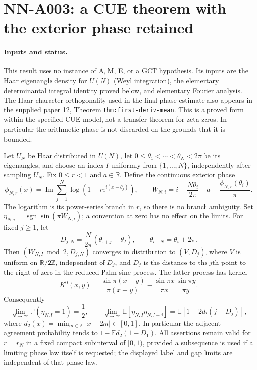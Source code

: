 \section{NN-A003: a CUE theorem with the exterior phase retained}
\label{sec:NN-A003}

\paragraph{Inputs and status.}
This result uses no instance of A, M, E, or a GCT hypothesis.  Its inputs are
the Haar eigenangle density for $U(N)$ (Weyl integration), the elementary
determinantal integral identity proved below, and elementary Fourier analysis.
The Haar character orthogonality used in the final phase estimate also appears
in the supplied paper 12, Theorem \texttt{thm:first-deriv-mean}.  This is a
proved form within the specified CUE model, not a transfer theorem for zeta
zeros.  In particular the arithmetic phase is not discarded on the grounds
that it is bounded.

\begin{theorem}
Let $U_N$ be Haar distributed in $U(N)$, let
$0\leq\theta_1<\cdots<\theta_N<2\pi$ be its eigenangles, and choose an index
$I$ uniformly from $\{1,\ldots,N\}$, independently after sampling $U_N$.
Fix $0\leq r<1$ and $a\in\mathbb R$.  Define the continuous exterior phase
\[
 \phi_{N,r}(x)=\operatorname{Im}\sum_{j=1}^N
       \log(1-r e^{i(x-\theta_j)}),
 \qquad
 W_{N,i}=i-\frac{N\theta_i}{2\pi}-a-
                 \frac{\phi_{N,r}(\theta_i)}{\pi}.
\]
The logarithm is its power-series branch in $r$, so there is no branch
ambiguity.  Set $\eta_{N,i}=\operatorname{sgn}\sin(\pi W_{N,i})$; a convention
at zero has no effect on the limits.  For fixed $j\geq1$, let
\[
 D_{j,N}=\frac{N}{2\pi}(\theta_{I+j}-\theta_I),
 \qquad \theta_{i+N}=\theta_i+2\pi.
\]
Then $(W_{N,I}\bmod2,D_{j,N})$ converges in distribution to $(V,D_j)$,
where $V$ is uniform on $\mathbb R/2\mathbb Z$, independent of $D_j$, and
$D_j$ is the distance to the $j$th point to the right of zero in the reduced
Palm sine process.  The latter process has kernel
\[
 K^{0}(x,y)=\frac{\sin\pi(x-y)}{\pi(x-y)}-
      \frac{\sin\pi x}{\pi x}\frac{\sin\pi y}{\pi y}.
\]
Consequently
\[
 \lim_{N\to\infty}\mathbb P(\eta_{N,I}=1)=\frac12,
 \qquad
 \lim_{N\to\infty}\mathbb E[\eta_{N,I}\eta_{N,I+j}]
       =\mathbb E[1-2d_2(j-D_j)],                 \tag{A003.1}
\]
where $d_2(x)=\min_{m\in\mathbb Z}|x-2m|\in[0,1]$.
In particular the adjacent agreement probability tends to
$1-\mathbb E d_2(1-D_1)$.  All assertions remain valid for $r=r_N$ in a fixed
compact subinterval of $[0,1)$, provided a subsequence is used if a limiting
phase law itself is requested; the displayed label and gap limits are
independent of that phase law.
\end{theorem}

